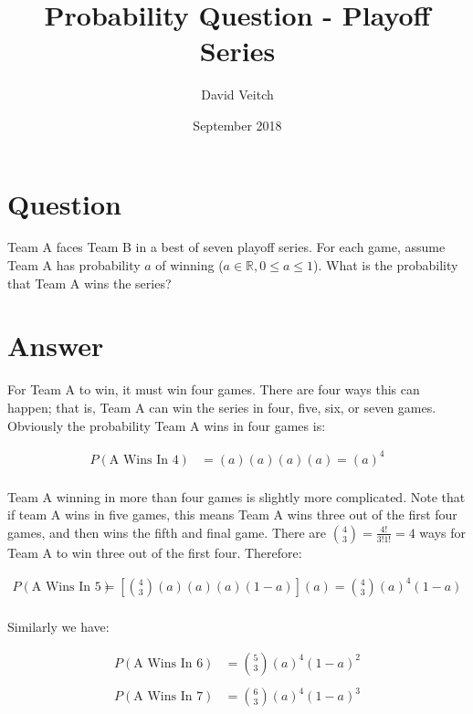 \documentclass{article}
\title{Probability Question - Playoff Series}
\author{David Veitch}
\date{September 2018}
\begin{document}
\maketitle

\section{Question}

Team A faces Team B in a best of seven playoff series. For each game, assume Team A has probability $a$ of winning ($a \in \mathbb{R}, 0 \leq a \leq 1$). What is the probability that Team A wins the series?

\section{Answer}

For Team A to win, it must win four games. There are four ways this can happen; that is, Team A can win the series in four, five, six, or seven games.\\

Obviously the probability Team A wins in four games is:

\begin{equation} 
\begin{split}
P(\text{A Wins In 4}) &= (a)(a)(a)(a) = (a)^{4}\\
\end{split}
\end{equation}

Team A winning in more than four games is slightly more complicated. Note that if team A wins in five games, this means Team A wins three out of the first four games, and then wins the fifth and final game. There are $\binom 43=\frac{4!}{3!1!} = 4$ ways for Team A to win three out of the first four. Therefore:

\begin{equation} 
\begin{split}
P(\text{A Wins In 5}) &= \left[ \binom 43(a)(a)(a)(1-a) \right](a)  = \binom 43 (a)^{4} (1-a)\\
\end{split}
\end{equation}

Similarly we have:

\begin{equation} 
\begin{split}
P(\text{A Wins In 6}) &=  \binom 53 (a)^{4} (1-a)^2\\
\end{split}
\end{equation}
\begin{equation} 
\begin{split}
P(\text{A Wins In 7}) &=  \binom 63 (a)^{4} (1-a)^3\\
\end{split}
\end{equation}
\end{document}
